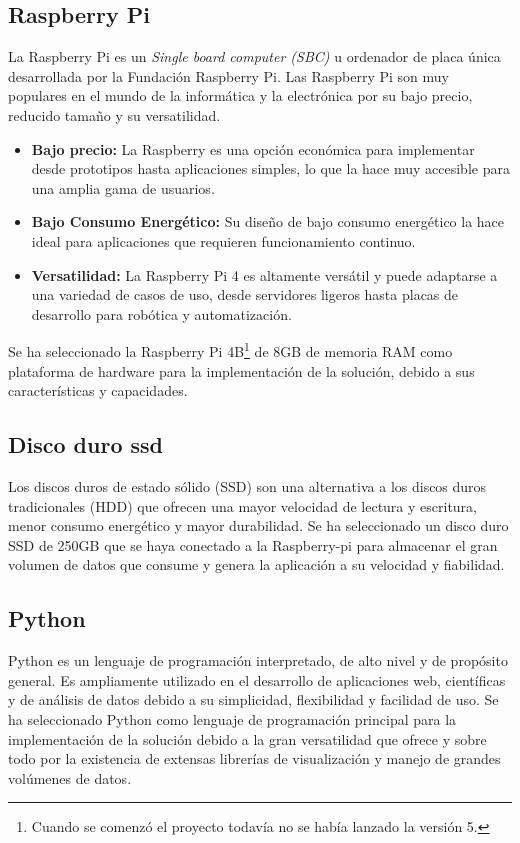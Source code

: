 \subsection{Raspberry Pi}

La Raspberry Pi es un \textit{Single board computer (SBC)} u ordenador de placa única desarrollada por la Fundación Raspberry Pi. Las Raspberry Pi son muy populares en el mundo de la informática y la electrónica por su bajo precio, reducido tamaño y su versatilidad.

\begin{itemize}
	\item \textbf{Bajo precio:} La Raspberry es una opción económica para implementar desde prototipos hasta aplicaciones simples, lo que la hace muy accesible para una amplia gama de usuarios.
	\item \textbf{Bajo Consumo Energético:} Su diseño de bajo consumo energético la hace ideal para aplicaciones que requieren funcionamiento continuo.
	\item \textbf{Versatilidad:} La Raspberry Pi 4 es altamente versátil y puede adaptarse a una variedad de casos de uso, desde servidores ligeros hasta placas de desarrollo para robótica y automatización.
\end{itemize}
Se ha seleccionado la Raspberry Pi 4B\footnote{Cuando se comenzó el proyecto todavía no se había lanzado la versión 5.} de 8GB de memoria RAM como plataforma de hardware para la implementación de la solución, debido a sus características y capacidades.

\subsection{Disco duro ssd}
Los discos duros de estado sólido (SSD) son una alternativa a los discos duros tradicionales (HDD) que ofrecen una mayor velocidad de lectura y escritura, menor consumo energético y mayor durabilidad. Se ha seleccionado un disco duro SSD de 250GB que se haya conectado a la Raspberry-pi para almacenar el gran volumen de datos que consume y genera la aplicación a su velocidad y fiabilidad.

\subsection{Python}
Python es un lenguaje de programación interpretado, de alto nivel y de propósito general. Es ampliamente utilizado en el desarrollo de aplicaciones web, científicas y de análisis de datos debido a su simplicidad, flexibilidad y facilidad de uso. Se ha seleccionado Python como lenguaje de programación principal para la implementación de la solución debido a la gran versatilidad que ofrece y sobre todo por la existencia de extensas librerías de visualización y manejo de grandes volúmenes de datos.

